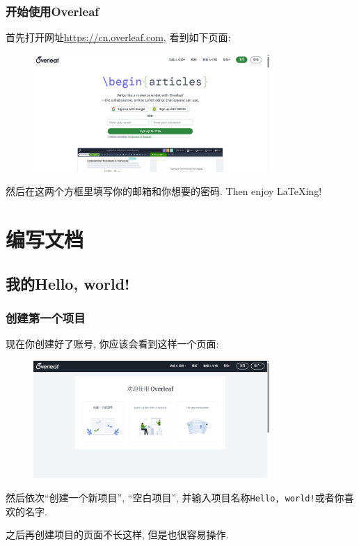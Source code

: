 \documentclass{beamer}
\begin{document}
\begin{frame}
    \frametitle{开始使用Overleaf}
    首先打开网址\url{https://cn.overleaf.com}, 看到如下页面:
    \begin{figure}[h]
        \centering
        \includegraphics[width=0.8\textwidth]{figure/overleaf-signin.png}
    \end{figure}\pause
    然后在这两个方框里填写你的邮箱和你想要的密码.
    Then enjoy \LaTeX{ing}!
\end{frame}

\section{编写文档}

\subsection{我的Hello, world!}

\begin{frame}
    \frametitle{创建第一个项目}
    现在你创建好了账号, 你应该会看到这样一个页面:
    \begin{figure}[h]
        \centering
        \includegraphics[width=0.8\textwidth]{figure/overleaf-startproject.png}
    \end{figure}\pause
    然后依次``创建一个新项目'', ``空白项目'', 并输入项目名称\Verb|Hello, world!|或者你喜欢的名字.\pause

    之后再创建项目的页面不长这样, 但是也很容易操作.
\end{frame}
\end{document}

